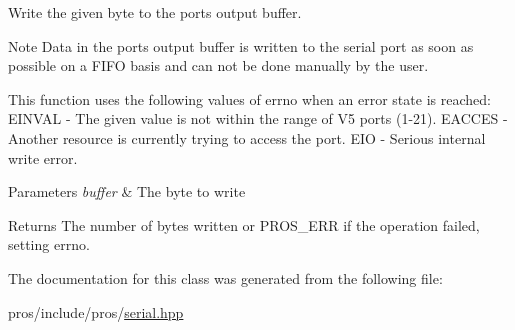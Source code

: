 Write the given byte to the port\textquotesingle{}s output buffer.

\begin{DoxyNote}{Note}
Data in the port\textquotesingle{}s output buffer is written to the serial port as soon as possible on a F\+I\+FO basis and can not be done manually by the user.
\end{DoxyNote}
This function uses the following values of errno when an error state is reached\+: E\+I\+N\+V\+AL -\/ The given value is not within the range of V5 ports (1-\/21). E\+A\+C\+C\+ES -\/ Another resource is currently trying to access the port. E\+IO -\/ Serious internal write error.


\begin{DoxyParams}{Parameters}
{\em buffer} & The byte to write\\
\hline
\end{DoxyParams}
\begin{DoxyReturn}{Returns}
The number of bytes written or P\+R\+O\+S\+\_\+\+E\+RR if the operation failed, setting errno. 
\end{DoxyReturn}


The documentation for this class was generated from the following file\+:\begin{DoxyCompactItemize}
\item 
pros/include/pros/\hyperlink{serial_8hpp}{serial.\+hpp}\end{DoxyCompactItemize}

